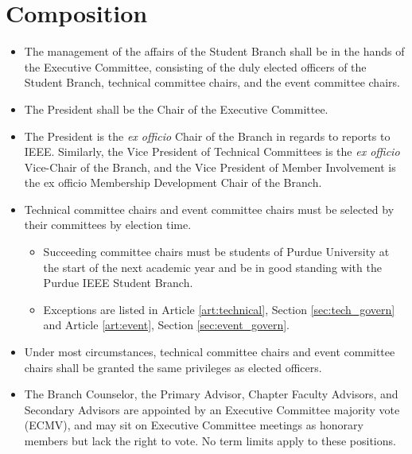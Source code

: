 \documentclass[12pt]{constitution}
\begin{document}
\section{Composition}
\label{sec:exec_comp}
\begin{itemize}
    \item The management of the affairs of the Student Branch shall be in the hands of the Executive Committee, consisting of the duly elected officers of the Student Branch, technical committee chairs, and the event committee chairs.
    \item The President shall be the Chair of the Executive Committee.
    \item The President is the \textit{ex officio} Chair of the Branch in regards to reports to IEEE. Similarly, the Vice President of Technical Committees is the \textit{ex officio} Vice-Chair of the Branch, and the Vice President of Member Involvement is the ex officio Membership Development Chair of the Branch.
    \item Technical committee chairs and event committee chairs must be selected by their committees by election time.
    \begin{itemize}
        \item Succeeding committee chairs must be students of Purdue University at the start of the next academic year and be in good standing with the Purdue IEEE Student Branch.
        \item Exceptions are listed in Article \ref{art:technical}, Section \ref{sec:tech_govern} and Article \ref{art:event}, Section \ref{sec:event_govern}.
    \end{itemize}
    \item Under most circumstances, technical committee chairs and event committee chairs shall be granted the same privileges as elected officers.
    \item The Branch Counselor, the Primary Advisor, Chapter Faculty Advisors, and Secondary Advisors are appointed by an Executive Committee majority vote (ECMV), and may sit on Executive Committee meetings as honorary members but lack the right to vote. No term limits apply to these positions.
\end{itemize}
\end{document}
